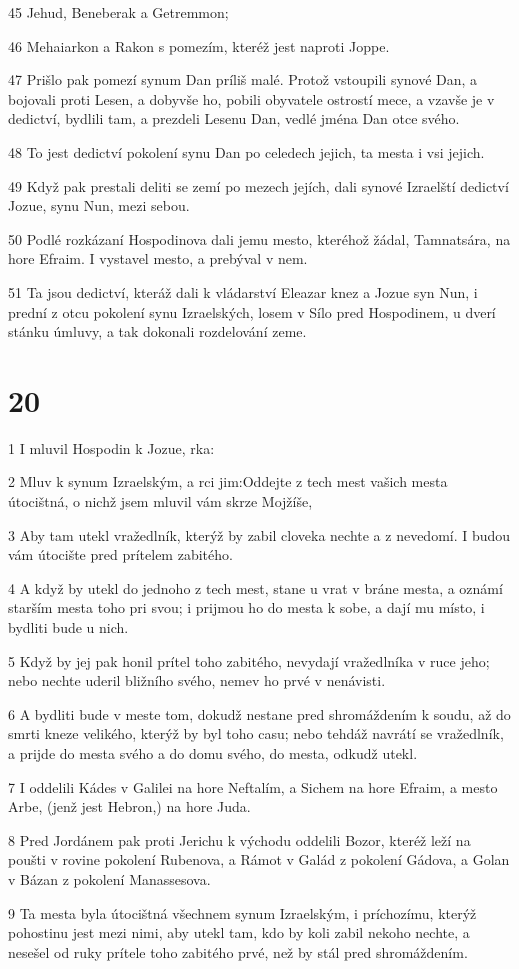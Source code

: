 \par 45 Jehud, Beneberak a Getremmon;
\par 46 Mehaiarkon a Rakon s pomezím, kteréž jest naproti Joppe.
\par 47 Prišlo pak pomezí synum Dan príliš malé. Protož vstoupili synové Dan, a bojovali proti Lesen, a dobyvše ho, pobili obyvatele ostrostí mece, a vzavše je v dedictví, bydlili tam, a prezdeli Lesenu Dan, vedlé jména Dan otce svého.
\par 48 To jest dedictví pokolení synu Dan po celedech jejich, ta mesta i vsi jejich.
\par 49 Když pak prestali deliti se zemí po mezech jejích, dali synové Izraelští dedictví Jozue, synu Nun, mezi sebou.
\par 50 Podlé rozkázaní Hospodinova dali jemu mesto, kteréhož žádal, Tamnatsára, na hore Efraim. I vystavel mesto, a prebýval v nem.
\par 51 Ta jsou dedictví, kteráž dali k vládarství Eleazar knez a Jozue syn Nun, i prední z otcu pokolení synu Izraelských, losem v Sílo pred Hospodinem, u dverí stánku úmluvy, a tak dokonali rozdelování zeme.

\chapter{20}

\par 1 I mluvil Hospodin k Jozue, rka:
\par 2 Mluv k synum Izraelským, a rci jim:Oddejte z tech mest vašich mesta útocištná, o nichž jsem mluvil vám skrze Mojžíše,
\par 3 Aby tam utekl vražedlník, kterýž by zabil cloveka nechte a z nevedomí. I budou vám útocište pred prítelem zabitého.
\par 4 A když by utekl do jednoho z tech mest, stane u vrat v bráne mesta, a oznámí starším mesta toho pri svou; i prijmou ho do mesta k sobe, a dají mu místo, i bydliti bude u nich.
\par 5 Když by jej pak honil prítel toho zabitého, nevydají vražedlníka v ruce jeho; nebo nechte uderil bližního svého, nemev ho prvé v nenávisti.
\par 6 A bydliti bude v meste tom, dokudž nestane pred shromáždením k soudu, až do smrti kneze velikého, kterýž by byl toho casu; nebo tehdáž navrátí se vražedlník, a prijde do mesta svého a do domu svého, do mesta, odkudž utekl.
\par 7 I oddelili Kádes v Galilei na hore Neftalím, a Sichem na hore Efraim, a mesto Arbe, (jenž jest Hebron,) na hore Juda.
\par 8 Pred Jordánem pak proti Jerichu k východu oddelili Bozor, kteréž leží na poušti v rovine pokolení Rubenova, a Rámot v Galád z pokolení Gádova, a Golan v Bázan z pokolení Manassesova.
\par 9 Ta mesta byla útocištná všechnem synum Izraelským, i príchozímu, kterýž pohostinu jest mezi nimi, aby utekl tam, kdo by koli zabil nekoho nechte, a nesešel od ruky prítele toho zabitého prvé, než by stál pred shromáždením.

